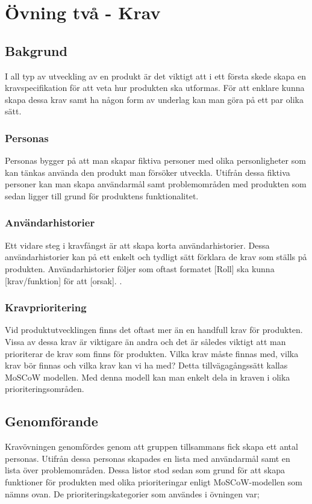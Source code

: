 \section{Övning två - Krav}

\subsection{Bakgrund}
I all typ av utveckling av en produkt är det viktigt att i ett första skede skapa en kravspecifikation för att veta hur produkten ska utformas. För att enklare kunna skapa dessa krav samt ha någon form av underlag kan man göra på ett par olika sätt. 

\subsubsection{Personas}
Personas bygger på att man skapar fiktiva personer med olika personligheter som kan tänkas använda den produkt man försöker utveckla. Utifrån dessa fiktiva personer kan man skapa användarmål samt problemområden med produkten som sedan ligger till grund för produktens funktionalitet.

\subsubsection{Användarhistorier}
Ett vidare steg i kravfångst är att skapa korta användarhistorier. Dessa användarhistorier kan på ett enkelt och tydligt sätt förklara de krav som ställs på produkten. Användarhistorier följer som oftast formatet [Roll] ska kunna [krav/funktion] för att [orsak].  \cite[s.110]{agilProj}.

\subsubsection{Kravprioritering}
Vid produktutvecklingen finns det oftast mer än en handfull krav för produkten. Vissa av dessa krav är viktigare än andra och det är således viktigt att man prioriterar de krav som finns för produkten. Vilka krav måste finnas med, vilka krav bör finnas och vilka krav kan vi ha med? Detta tillvägagångssätt kallas MoSCoW modellen.  Med denna modell kan man enkelt dela in kraven i olika prioriteringsområden. \cite[s. 118]{agilProj}

\newpage

\subsection{Genomförande}
Kravövningen genomfördes genom att gruppen tillsammans fick skapa ett antal personas. Utifrån dessa personas skapades en lista med användarmål samt en lista över problemområden. Dessa listor stod sedan som grund för att skapa funktioner för produkten med olika prioriteringar enligt MoSCoW-modellen som nämns ovan. De prioriteringskategorier som användes i övningen var;

